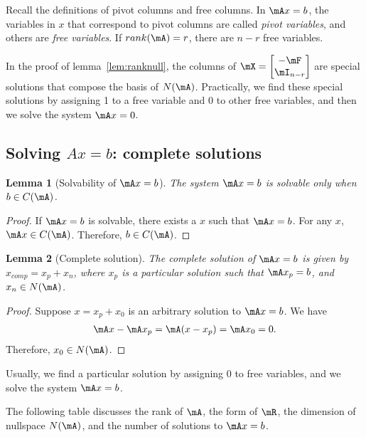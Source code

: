 \documentclass[11pt]{article}
\theoremstyle{plain}
\newtheorem{lem}{Lemma}
\theoremstyle{definition}
\begin{document}
Recall the definitions of pivot columns and free columns. In $\mA x = b$, the variables in $x$ that correspond to pivot columns are called \textit{pivot variables}, and others are \textit{free variables}. If $rank(\mA) = r$, there are $n-r$ free variables. 

In the proof of lemma~\ref{lem:ranknull}, the columns of $\mX = \begin{bmatrix} -\mF \\ \mI_{n-r}	\end{bmatrix}$ are special solutions that compose the basis of $N(\mA)$. Practically, we find these special solutions by assigning 1 to a free variable and 0 to other free variables, and then we solve the system $\mA x = 0$. 



\subsection{Solving $Ax = b$: complete solutions}

\begin{lem}[Solvability of $\mA x = b$]\label{lem:solve} The system $\mA x = b$ is solvable only when $b \in C(\mA)$.	
\end{lem}

\begin{proof}
	 If $\mA x = b$ is solvable, there exists a $x$ such that $\mA x = b$. For any $x$, $\mA x \in C(\mA)$. Therefore, $b \in C(\mA)$.
\end{proof}

\begin{lem}[Complete solution]\label{lem:compsolu} The complete solution of $\mA x = b$ is given by $x_{comp} = x_p + x_n$, where $x_p$ is a particular solution such that $\mA x_p = b$, and $x_n \in N(\mA)$. 
\end{lem}

\begin{proof}
	Suppose $x = x_p + x_0$ is an arbitrary solution to $\mA x= b$. We have 
	\begin{align}
		\mA x - \mA x_p = \mA (x- x_p) = \mA x_0 = 0.
	\end{align}
	Therefore, $x_0 \in N(\mA)$.
\end{proof}

Usually, we find a particular solution by assigning 0 to free variables, and we solve the system $\mA x = b$. 

\vspace{.2cm}
The following table discusses the rank of $\mA$, the form of $\mR$, the dimension of nullspace $N(\mA)$, and the number of solutions to $\mA x = b$.
\end{document}
